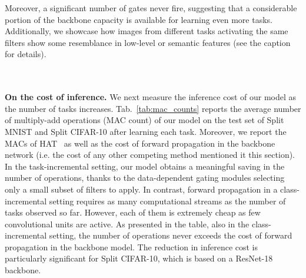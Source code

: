\documentclass[10pt,twocolumn,letterpaper]{article}
\begin{document}
Moreover, a significant number of gates never fire, suggesting that a considerable portion of the backbone capacity is available for learning even more tasks. Additionally, we showcase how images from different tasks activating the same filters show some resemblance in low-level or semantic features (see the caption for details).
\begin{table}[b]
\centering
{}
\caption{Average MAC counts () of inference in Split MNIST and Split CIFAR-10. We compute MACs on the test sets, at different stages of the optimization (up to ), both in task-incremental (TI) and class-incremental (CI) setups.}
\label{tab:mac_counts}
\end{table} \\\\
\textbf{On the cost of inference.}
We next measure the inference cost of our model as the number of tasks increases. Tab.~\ref{tab:mac_counts} reports the average number of multiply-add operations (MAC count) of our model on the test set of Split MNIST and Split CIFAR-10 after learning each task. Moreover, we report the MACs of HAT~\cite{hat} as well as the cost of forward propagation in the backbone network (i.e. the cost of any other competing method mentioned it this section). In the task-incremental setting, our model obtains a meaningful saving in the number of operations, thanks to the data-dependent gating modules selecting only a small subset of filters to apply. In contrast, forward propagation in a class-incremental setting requires as many computational streams as the number of tasks observed so far. However, each of them is extremely cheap as few convolutional units are active. As presented in the table, also in the class-incremental setting, the number of operations never exceeds the cost of forward propagation in the backbone model. The reduction in inference cost is particularly significant for Split CIFAR-10, which is based on a ResNet-18 backbone.\\\\
\end{document}
